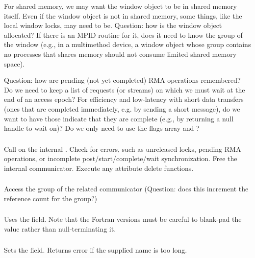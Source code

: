\documentclass{article}
\begin{document}
For shared memory, we may want the window object to be in shared
memory itself.  Even if the window object is not in shared memory,
some things, like the local window locks, may need to be.  Question:
how is the window object allocated?  If there is an MPID routine for
it, does it need to know the group of the window (e.g., in a
multimethod device, a window object whose group contains no processes
that shares memory should not consume limited shared memory space).

Question: how are pending (not yet completed) RMA operations
remembered?  Do we need to keep a list of requests (or streams) on which we
must 
wait at the end of an access epoch?  For efficiency and low-latency
with short data transfers (ones that are completed immediately,
e.g. by sending a short message), do we want to have those indicate
that they are complete (e.g., by returning a null handle to wait on)?
Do we only need to use the flags array and ?

\subsubsection{}
Call  on the internal .
Check for errors, such as unreleased locks, pending RMA operations, or
incomplete 
post/start/complete/wait synchronization.
Free the internal communicator.  Execute any attribute delete functions.

\subsubsection{}
Access the group of the related communicator (Question: does this increment the
reference count for the group?)

\subsubsection{}
Uses the  field.  Note that the Fortran versions
must be careful to blank-pad the value rather than null-terminating it.

\subsubsection{}
Sets the  field.  Returns error if the supplied name
is too long. 
\end{document}

